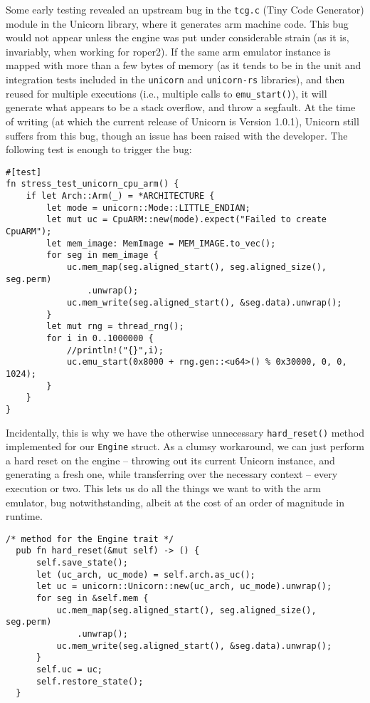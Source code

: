 \documentclass[11pt]{article}
\begin{document}
Some early testing revealed an upstream bug in the \texttt{tcg.c} (Tiny
Code Generator) module in the Unicorn library, where it generates
\gls{arm} machine code. This bug would not appear unless the engine
was put under considerable strain (as it is, invariably, when working
for \gls{roper2}). If the same \gls{arm} emulator instance is mapped with more
than a few bytes of memory (as it tends to be in the unit and integration
tests included in the \texttt{unicorn} and \texttt{unicorn-rs} libraries), and then
reused for multiple executions (i.e., multiple calls to \texttt{emu\_start()}),
it will generate what appears to be a stack overflow, and throw a
segfault. At the time of writing (at which the current release of
Unicorn is Version 1.0.1), Unicorn still suffers from this bug, though
an issue has been raised with the developer. The following test is
enough to trigger the bug:  

\lstset{language=rust,label=org82c2abd,caption= ,captionpos=b,numbers=none}
\begin{lstlisting}
#[test]
fn stress_test_unicorn_cpu_arm() {
    if let Arch::Arm(_) = *ARCHITECTURE {
        let mode = unicorn::Mode::LITTLE_ENDIAN;
        let mut uc = CpuARM::new(mode).expect("Failed to create CpuARM");
        let mem_image: MemImage = MEM_IMAGE.to_vec();
        for seg in mem_image {
            uc.mem_map(seg.aligned_start(), seg.aligned_size(), seg.perm)
                .unwrap();
            uc.mem_write(seg.aligned_start(), &seg.data).unwrap();
        }
        let mut rng = thread_rng();
        for i in 0..1000000 {
            //println!("{}",i);
            uc.emu_start(0x8000 + rng.gen::<u64>() % 0x30000, 0, 0, 1024);
        }
    }
}
\end{lstlisting}

Incidentally, this is why we have the otherwise unnecessary \texttt{hard\_reset()}
method implemented for our \texttt{Engine} struct. As a clumsy workaround, we can
just perform a hard reset on the engine -- throwing out its current Unicorn
instance, and generating a fresh one, while transferring over the necessary
context -- every execution or two. This lets us do all the things we want to
with the \gls{arm} emulator, bug notwithstanding, albeit at the cost of an
order of magnitude in runtime. 

\lstset{language=rust,label=org990390e,caption= ,captionpos=b,numbers=none}
\begin{lstlisting}
/* method for the Engine trait */
  pub fn hard_reset(&mut self) -> () {
      self.save_state();
      let (uc_arch, uc_mode) = self.arch.as_uc();
      let uc = unicorn::Unicorn::new(uc_arch, uc_mode).unwrap();
      for seg in &self.mem {
          uc.mem_map(seg.aligned_start(), seg.aligned_size(), seg.perm)
              .unwrap();
          uc.mem_write(seg.aligned_start(), &seg.data).unwrap();
      }
      self.uc = uc;
      self.restore_state();
  }
\end{lstlisting}
\end{document}
